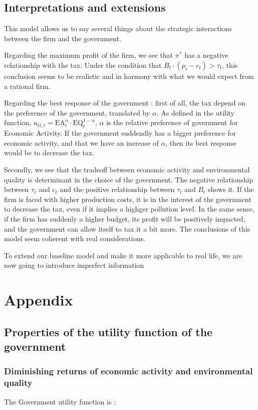 \documentclass{article}
\begin{document}
\subsection{Interpretations and extensions}

This model allows us to say several things about the strategic interactions between the firm and the government. 

Regarding the maximum profit of the firm, we see that $\pi^{*}$ has a negative relationship with the tax.
Under the condition that $B_{t}\cdot (p_{t}-c_{t})>\tau_{t}$, this conclusion seems to be realistic and in harmony with what we would expect from a rational firm. 

Regarding the best response of the government : first of all, the tax depend on the preference of the government, translated by $\alpha$.
As defined in the utility function, $u_{G,t}=\text{EA}_{t}^{\alpha}\cdot\text{EQ}_{t}^{1-\alpha}$, $\alpha$ is the relative preference of government for Economic Activity. 
If the government suddendly has a bigger preference for economic activity, and that we have an increase of $\alpha$, then its best response would be to decrease the tax.

Secondly, we see that the tradeoff between economic activity and environmental quality is determinant in the choice of the government. 
The negative relationship between $\tau_{t}$ and $c_{t}$ and the positive relationship between $\tau_{t}$ and $B_{t}$ shows it. 
If the firm is faced with higher production costs, it is in the interest of the government to decrease the tax, even if it implies a highger pollution level. 
In the same sense, if the firm has suddenly a higher budget, its profit will be positively impacted, and the government can allow itself to tax it a bit more. 
The conclusions of this model seem coherent with real considerations. 

To extend our baseline model and make it more applicable to real life, we are now going to introduce imperfect information

\pagebreak
\section{Appendix}

\subsection{Properties of the utility function of the government}

\subsubsection{Diminishing returns of economic activity and environmental quality}
\label{sec:properties_utility_function_gov_1}
The Government utility function is :
\end{document}
